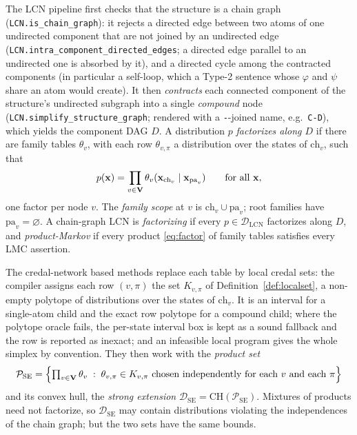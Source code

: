\documentclass{article} %
\newcommand{\DSE}{\mathcal{D}_{\mathrm{SE}}}
\newcommand{\DLCN}{\mathcal{D}_{\mathrm{LCN}}}
\newcommand{\ch}{\mathrm{ch}}
\newcommand{\pa}{\mathrm{pa}}
\begin{document}
The LCN pipeline first checks that the structure is a chain graph
(\texttt{LCN.is\_chain\_graph}): it rejects a directed edge between two atoms of
one undirected component that are not joined by an undirected edge
(\texttt{LCN.intra\_component\_directed\_edges}; a directed edge parallel to an
undirected one is absorbed by it), and a directed cycle among the contracted
components (in particular a self-loop, which a Type-2 sentence whose $\varphi$
and $\psi$ share an atom would create). It then \emph{contracts} each connected
component of the structure's undirected subgraph into a single \emph{compound}
node (\texttt{LCN.simplify\_structure\_graph}; rendered with a
\texttt{-}-joined name, e.g.\ \texttt{C-D}), which yields the component DAG $D$.
A distribution $p$ \emph{factorizes along $D$} if there are family tables
$\theta_v$, with each row $\theta_{v,\pi}$ a distribution over the states of
$\ch_v$, such that
\begin{equation}\label{eq:factor}
  p(\bx)=\prod_{v\in\bV}\theta_v(\bx_{\ch_v}\mid\bx_{\pa_v})\qquad\text{for all }\bx,
\end{equation}
one factor per node $v$. The \emph{family scope} at $v$ is $\ch_v\cup\pa_v$;
root families have $\pa_v=\varnothing$. A chain-graph LCN is \emph{factorizing}
if every $p\in\DLCN$ factorizes along $D$, and \emph{product-Markov} if every
product \eqref{eq:factor} of family tables satisfies every LMC assertion.

The credal-network based methods replace each table by local credal sets: the
compiler assigns each row $(v,\pi)$ the set $K_{v,\pi}$ of
Definition~\ref{def:localset}, a non-empty polytope of distributions over the
states of $\ch_v$. It is an interval for a single-atom child and the exact row
polytope for a compound child; where the polytope oracle fails, the per-state
interval box is kept as a sound fallback and the row is reported as inexact; and
an infeasible local program gives the whole simplex by convention. They then work
with the \emph{product set}
\begin{equation}\label{eq:se-app}
  \mathcal P_{\mathrm{SE}}=\Bigl\{\textstyle\prod_{v\in\mathbf{V}} \theta_v\;:\;\theta_{v,\pi}\in K_{v,\pi}
  \text{ chosen independently for each }v\text{ and each }\pi\Bigr\}
\end{equation}
and its convex hull, the \emph{strong extension} $\DSE=\mathrm{CH}(\mathcal
P_{\mathrm{SE}})$. Mixtures of products need not factorize, so $\DSE$ may contain
distributions violating the independences of the chain graph; but the two sets
have the same bounds.
\end{document}
